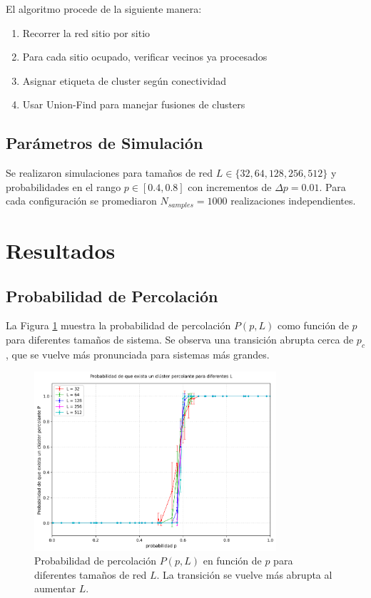 \documentclass[11pt,a4paper]{article}
\begin{document}
El algoritmo procede de la siguiente manera:
\begin{enumerate}
    \item Recorrer la red sitio por sitio
    \item Para cada sitio ocupado, verificar vecinos ya procesados
    \item Asignar etiqueta de cluster según conectividad
    \item Usar Union-Find para manejar fusiones de clusters
\end{enumerate}

\subsection{Parámetros de Simulación}

Se realizaron simulaciones para tamaños de red $L \in \{32, 64, 128, 256, 512\}$ y probabilidades en el rango $p \in [0.4, 0.8]$ con incrementos de $\Delta p = 0.01$. Para cada configuración se promediaron $N_{samples} = 1000$ realizaciones independientes.

\section{Resultados}

\subsection{Probabilidad de Percolación}

La Figura \ref{fig:percolation_prob} muestra la probabilidad de percolación $P(p,L)$ como función de $p$ para diferentes tamaños de sistema. Se observa una transición abrupta cerca de $p_c$, que se vuelve más pronunciada para sistemas más grandes.

\begin{figure}[H]
    \centering
    \includegraphics[width=0.8\textwidth]{../figures/P_all_L.png}
    \caption{Probabilidad de percolación $P(p,L)$ en función de $p$ para diferentes tamaños de red $L$. La transición se vuelve más abrupta al aumentar $L$.}
    \label{fig:percolation_prob}
\end{figure}
\end{document}

